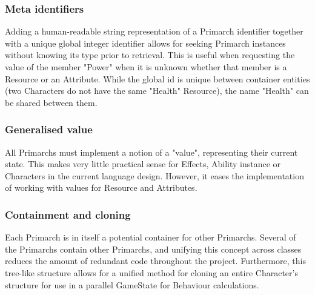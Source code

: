 \subsubsection*{Meta identifiers}
Adding a human-readable string representation of a Primarch identifier together with a unique global integer identifier allows for seeking Primarch instances without knowing its type prior to retrieval. This is useful when requesting the value of the member "Power" when it is unknown whether that member is a Resource or an Attribute. While the global id is unique between container entities (two Characters do not have the same "Health" Resource), the name "Health" can be shared between them.

\subsubsection*{Generalised value}
All Primarchs must implement a notion of a "value", representing their current state. This makes very little practical sense for Effects, Ability instance or Characters in the current language design. However, it eases the implementation of working with values for Resource and Attributes.

\subsubsection*{Containment and cloning}
Each Primarch is in itself a potential container for other Primarchs. Several of the Primarchs contain other Primarchs, and unifying this concept across classes reduces the amount of redundant code throughout the project. Furthermore, this tree-like structure allows for a unified method for cloning an entire Character's structure for use in a parallel GameState for Behaviour calculations.
